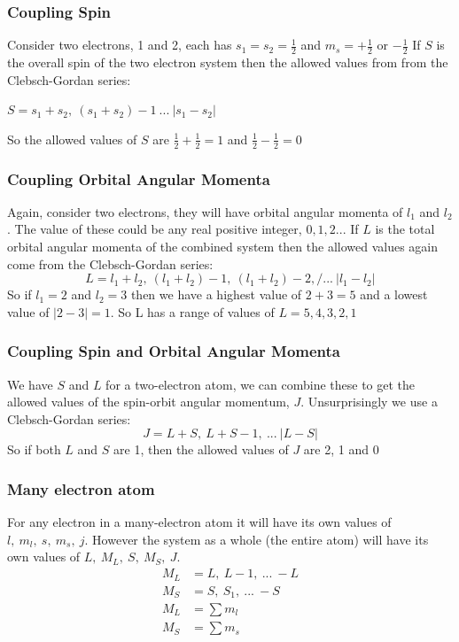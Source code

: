 \documentclass{article}
\begin{document}
    \subsubsection{Coupling Spin}
    Consider two electrons, 1 and 2, each has $s_1 = s_2 = \frac{1}{2}$ and $m_s = +\frac{1}{2}$ or $-\frac{1}{2}$
    If $S$ is the overall spin of the two electron system then the allowed values from from the Clebsch-Gordan series:
    \begin{center}
        \begin{math}
            S = s_1 + s_2 ,\ (s_1 + s_2)-1 \ ... \ |s_1 - s_2|
        \end{math}
    \end{center}
    So the allowed  values of $S$ are $\frac{1}{2} + \frac{1}{2} = 1$ and $\frac{1}{2} - \frac{1}{2} = 0$

    \subsubsection{Coupling Orbital Angular Momenta}
    Again, consider two electrons, they will have orbital angular momenta of $l_1$ and $l_2$. The value
    of these could be any real positive integer, $0, 1, 2...$ If $L$ is the total orbital angular momenta 
    of the combined system then the allowed values again come from the Clebsch-Gordan series:
    $$L = l_1 + l_2,\ (l_1 + l_2) - 1,\ (l_1 + l_2) - 2,/ ...\ |l_1 - l_2|$$
    So if $l_1 = 2$ and $l_2 = 3$ then we have a highest value of $2+3=5$ and a lowest value of $|2-3| = 1$.
    So L has a range of values of $L = 5, 4, 3, 2, 1$

    \subsubsection{Coupling Spin and Orbital Angular Momenta}
    We have $S$ and $L$ for a two-electron atom, we can combine these to get the allowed values of the 
    spin-orbit angular momentum, $J$. Unsurprisingly we use a Clebsch-Gordan series:
    $$J = L + S,\ L+S-1,\ ...\ |L-S|$$
    So if both $L$ and $S$ are 1, then the allowed values of $J$ are 2, 1 and 0

    \subsubsection{Many electron atom}
    For any electron in a many-electron atom it will have its own values of $l,\ m_l,\ s,\ m_s,\ j$.
    However the system as a whole (the entire atom) will have its own values of $L,\ M_L,\ S,\ M_S,\ J$.
    \begin{align*}
        M_L &= L,\ L-1,\ ...\ -L\\
        M_S &= S,\ S_1,\ ...\ -S \\
        M_L &= \sum m_l \\
        M_S &= \sum m_s 
    \end{align*}
\end{document}
